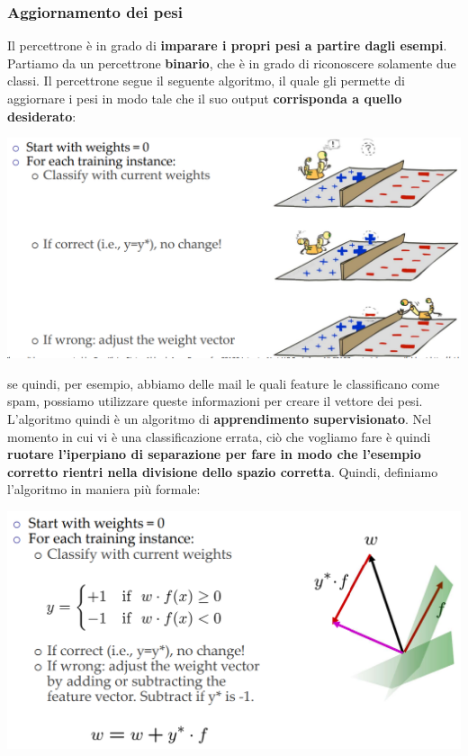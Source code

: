 \documentclass[12pt]{article}
\begin{document}
\subsubsection{Aggiornamento dei pesi}
Il percettrone è in grado di \textbf{imparare i propri pesi a partire dagli esempi}.
Partiamo da un percettrone \textbf{binario}, che è in grado di riconoscere solamente due classi.
Il percettrone segue il seguente algoritmo, il quale gli permette di aggiornare i pesi in modo tale che il suo output \textbf{corrisponda a quello desiderato}:
\begin{center}
    \includegraphics[width =1\linewidth]{Images/94.PNG}
\end{center}
se quindi, per esempio, abbiamo delle mail le quali feature le classificano come spam, possiamo utilizzare queste informazioni per creare il vettore dei pesi.
L'algoritmo quindi è un algoritmo di \textbf{apprendimento supervisionato}.
Nel momento in cui vi è una classificazione errata, ciò che vogliamo fare è quindi \textbf{ruotare l'iperpiano di separazione per fare in modo che l'esempio corretto rientri nella divisione dello spazio corretta}.
Quindi, definiamo l'algoritmo in maniera più formale:
\begin{center}
    \includegraphics[width =1\linewidth]{Images/95.PNG}
\end{center}
\end{document}
